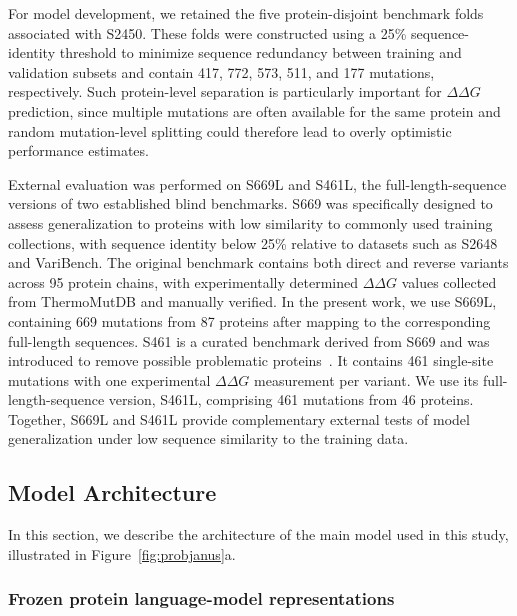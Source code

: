 \documentclass[11pt]{article}
\begin{document}
For model development, we retained the five protein-disjoint benchmark folds associated with S2450. These folds were constructed using a 25\% sequence-identity threshold to minimize sequence redundancy between training and validation subsets and contain 417, 772, 573, 511, and 177 mutations, respectively. Such protein-level separation is particularly important for \(\Delta\Delta G\) prediction, since multiple mutations are often available for the same protein and random mutation-level splitting could therefore lead to overly optimistic performance estimates\cite{barducci2026janusddg}.

External evaluation was performed on S669L and S461L, the full-length-sequence versions of two established blind benchmarks. S669\cite{pancotti2022predicting} was specifically designed to assess generalization to proteins with low similarity to commonly used training collections, with sequence identity below 25\% relative to datasets such as S2648 and VariBench\cite{nair2013v}. The original benchmark contains both direct and reverse variants across 95 protein chains, with experimentally determined \(\Delta\Delta G\) values collected from ThermoMutDB and manually verified. In the present work, we use S669L, containing 669 mutations from 87 proteins after mapping to the corresponding full-length sequences.
S461 is a curated benchmark derived from S669 and was introduced to remove possible problematic proteins~\cite{hernandez2023predicting}.
It contains 461 single-site mutations with one experimental \(\Delta\Delta G\) measurement per variant. We use its full-length-sequence version, S461L, comprising 461 mutations from 46 proteins. Together, S669L and S461L provide complementary external tests of model generalization under low sequence similarity to the training data.

\subsection{Model Architecture}

In this section, we describe the architecture of the main model used in this study, illustrated in Figure~\ref{fig:probjanus}a.


\subsubsection{Frozen protein language-model representations}
\end{document}
